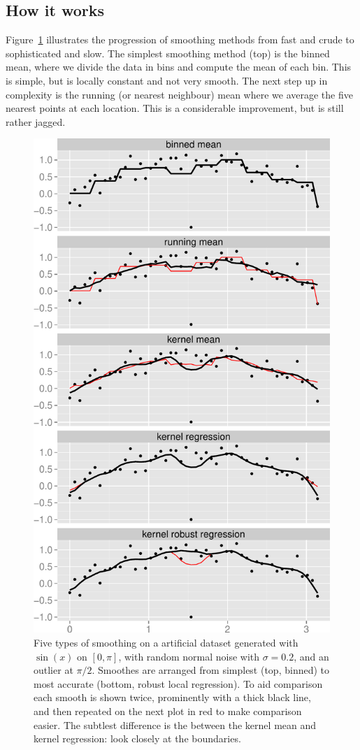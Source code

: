 \documentclass[journal]{vgtc}                %
\begin{document}
\subsection{How it works}

Figure~\ref{fig:smooth-types} illustrates the progression of smoothing methods from fast and crude to sophisticated and slow. The simplest smoothing method (top) is the binned mean, where we divide the data in bins and compute the mean of each bin. This is simple, but is locally constant and not very smooth. The next step up in complexity is the running (or nearest neighbour) mean where we average the five nearest points at each location.  This is a considerable improvement, but is still rather jagged.

\begin{figure}[htb]
 \centering
 \includegraphics[width=0.75\linewidth]{smooth-types}
 \caption{Five types of smoothing on a artificial dataset generated with $\sin(x)$ on $[0, \pi]$, with random normal noise with $\sigma = 0.2$, and an outlier at $\pi / 2$. Smoothes are arranged from simplest (top, binned) to most accurate (bottom, robust local regression). To aid comparison each smooth is shown twice, prominently with a thick black line, and then repeated on the next plot in red to make comparison easier. The subtlest difference is the between the kernel mean and kernel regression: look closely at the boundaries.}
 \label{fig:smooth-types}
\end{figure}
\end{document}
